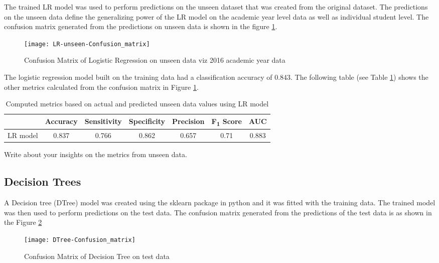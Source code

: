 \documentclass[11pt,openright]{report}
\begin{document}
The trained LR model was used to perform predictions on the unseen dataset that was created from the original dataset. The predictions on the unseen data define the generalizing power of the LR model on the academic year level data as well as individual student level. The confusion matrix generated from the predictions on unseen data is shown in the figure \ref{fig:lr_unseen_confusion_matrix}.

  \begin{figure}[!htbp]
	\centering
	\texttt{[image: LR-unseen-Confusion\_matrix]}
	\caption{Confusion Matrix of Logistic Regression on unseen data viz 2016 academic year data}
	\label{fig:lr_unseen_confusion_matrix}
\end{figure} 


The logistic regression model built on the training data had a classification accuracy of 0.843. The following table (see Table \ref{table:lr-unseen_metrics_db}) shows the other metrics calculated from the confusion matrix in Figure \ref{fig:lr_unseen_confusion_matrix}.

\begin{table}[!htbp]
	\renewcommand{\arraystretch}{1.3}
	\caption{Computed metrics based on actual and predicted unseen data values using LR model}
	\label{table:lr-unseen_metrics_db}
	\centering
	\begin{tabular}{|c|c|c|c|c|c|c|}
    \hline
  	 & \bfseries Accuracy & \bfseries Sensitivity & \bfseries Specificity & \bfseries Precision & \bfseries F\textsubscript{1} Score  & \bfseries AUC\\  
    \hline
	LR model & 0.837 & 0.766 & 0.862 & 0.657 & 0.71 & 0.883 \\ \hline
	\end{tabular} 
\end{table}
Write about your insights on the metrics from unseen data.



\subsection {Decision Trees}
A Decision tree (DTree) model was created using the sklearn package in python and it was fitted with the training data. The trained model was then used to perform predictions on the test data. The confusion matrix generated from the predictions of the test data is as shown in the Figure \ref{fig:Dtree_confusion_matrix}

  \begin{figure}
	\centering
	\texttt{[image: DTree-Confusion\_matrix]}
	\caption{Confusion Matrix of Decision Tree on test data}
	\label{fig:Dtree_confusion_matrix}
\end{figure} 
\end{document}
